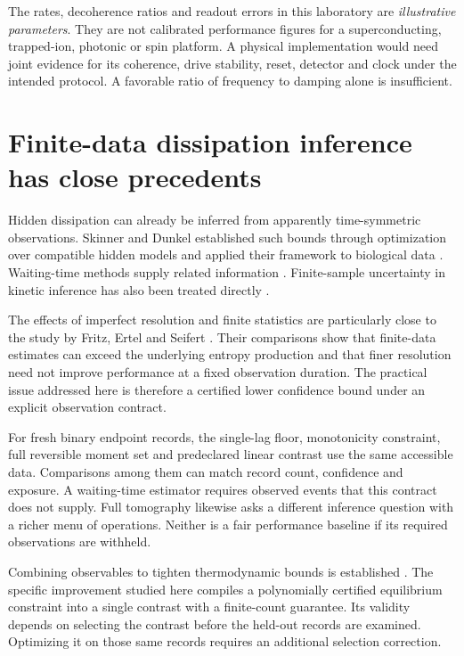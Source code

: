 The rates, decoherence ratios and readout errors in this laboratory are
\emph{illustrative parameters}. They are not calibrated performance figures
for a superconducting, trapped-ion, photonic or spin platform. A physical
implementation would need joint evidence for its coherence, drive stability,
reset, detector and clock under the intended protocol. A favorable ratio of
frequency to damping alone is insufficient.

\section{Finite-data dissipation inference has close precedents}

Hidden dissipation can already be inferred from apparently time-symmetric
observations. Skinner and Dunkel established such bounds through optimization
over compatible hidden models and applied their framework to biological data
\cite{vlSkinner2021}. Waiting-time methods supply related information
\cite{vlSkinnerWaiting2021}. Finite-sample uncertainty in kinetic inference has
also been treated directly \cite{vlBebon2023}.

The effects of imperfect resolution and finite statistics are particularly
close to the study by Fritz, Ertel and Seifert \cite{vlFritz2025}. Their
comparisons show that finite-data estimates can exceed the underlying entropy
production and that finer resolution need not improve performance at a fixed
observation duration. The practical issue addressed here is therefore a
certified lower confidence bound under an explicit observation contract.

For fresh binary endpoint records, the single-lag floor, monotonicity
constraint, full reversible moment set and predeclared linear contrast use
the same accessible data. Comparisons among them can match record count,
confidence and exposure. A waiting-time estimator requires observed events
that this contract does not supply. Full tomography likewise asks a different
inference question with a richer menu of operations. Neither is a fair
performance baseline if its required observations are withheld.

Combining observables to tighten thermodynamic bounds is established
\cite{vlDechant2021}. The specific improvement studied here compiles a
polynomially certified equilibrium constraint into a single contrast with a
finite-count guarantee. Its validity depends on selecting the contrast before
the held-out records are examined. Optimizing it on those same records requires
an additional selection correction.

